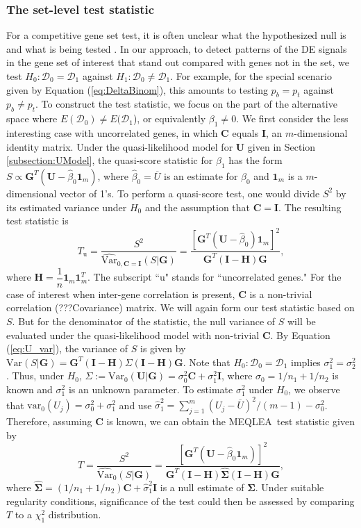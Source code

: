 \documentclass[useAMS,usenatbib, galley]{biom}
\newcommand{\OurMethod}{MEQLEA}
\begin{document}
	\subsubsection{The set-level test statistic}\label{subsection:MEQL}
	For a competitive gene set test, it is often unclear what the hypothesized null is and what is being tested \citep{barry2008statistical,wu2012camera}. In our approach, to detect patterns of the DE signals in the gene set of interest that stand out compared with genes not in the set, we test $H_0: \mathscr{D}_0=\mathscr{D}_1$ against $H_1: \mathscr{D}_0\ne\mathscr{D}_1$. For example, for the special scenario given by Equation (\ref{eq:DeltaBinom}), this amounts to testing $p_{b}=p_{t}$ against $p_{b}\ne p_{t}$.
	To construct the test statistic, we focus on the part of the alternative space where $E(\mathscr{D}_0)\ne E(\mathscr{D}_1$), or equivalently $\beta_1\ne 0$. We first consider the less interesting case with uncorrelated genes, in which $\bm C$ equals $\bm I$, an $m$-dimensional identity matrix. Under the quasi-likelihood model for $\bm U$ given in Section \ref{subsection:UModel},  the quasi-score statistic for $\beta_1$ has the form $S \propto \bm G^T(\bm U-\hat\beta_0\bm 1_m)$, where $\hat\beta_0=\overline{U}$ is an estimate for $\beta_0$ and $\bm 1_m$ is a $m$-dimensional vector of 1's. To perform a quasi-score test, one would divide $S^2$ by its estimated variance under $H_0$ and the assumption that $\bm C=\bm I$. The resulting test statistic is 
	\begin{equation}
		T_{\text{u}} = \dfrac{S^2}{\widehat{\mbox{Var}}_{0, \bm C=\bm I}(S|\bm G)} = \dfrac{[\bm G^T(\bm U-\hat\beta_0)\bm 1_m]^2}{\bm G^T(\bm I-\bm H)\bm G}, 
	\end{equation}
	where $\bm H = \dfrac{1}{n}\bm 1_m\bm 1_m^T$. The subscript ``u" stands for ``uncorrelated genes." For the case of interest when inter-gene correlation is present, $\bm C$ is a non-trivial correlation (???Covariance) matrix. We will again form our test statistic based on $S$. But for the denominator of the statistic, the null variance of $S$ will be evaluated under the quasi-likelihood model with non-trivial $\bm C$. By Equation (\ref{eq:U_var}), the variance of $S$ is given by $\mbox{Var}(S|\bm G) = \bm G^T(\bm I-\bm H)\Sigma(\bm I-\bm H)\bm G$. Note that $H_0: \mathscr{D}_0=\mathscr{D}_1$ implies $\sigma_1^2=\sigma_2^2$. Thus, under $H_0$, $\Sigma:=\mbox{Var}_{0}(\bm U|\bm G)=\sigma_0^2\bm C+\sigma_1^2\bm I$, where $\sigma_0=1/n_1+1/n_2$ is known and $\sigma_1^2$ is an unknown parameter. To estimate $\sigma_1^2$ under $H_0$, we observe that $\mbox{var}_{0}(U_j)=\sigma_0^2+\sigma_1^2$ and use $\hat\sigma_1^2=\sum_{j=1}^m(U_j-\overline{U})^2/(m-1)-\sigma_0^2$. Therefore, assuming $\bm C$ is known, we can obtain the \OurMethod~test statistic given by
	\begin{equation}
		T = \dfrac{S^2}{\widehat{\mbox{Var}}_{0}(S|\bm G)} = \dfrac{[\bm G^T(\bm U-\hat\beta_0\bm 1_m)]^2}{\bm G^T(\bm I-\bm H)\hat{\bm\Sigma}(\bm I-\bm H)\bm G}, 
	\end{equation}
	where $\hat{\bm\Sigma}=(1/n_1+1/n_2)\bm C+\hat\sigma_1^2\bm I$ is a null estimate of $\bm \Sigma$. Under suitable regularity conditions, significance of the test could then be assessed by comparing $T$ to a $\chi^2_1$ distribution.
	
\end{document}
